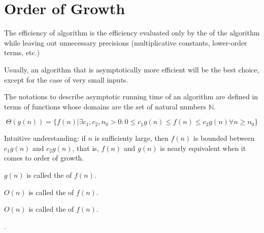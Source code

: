 \chapter{Order of Growth}

  \par The  efficiency of algorithm is the efficiency
  evaluated only by the  of the algorithm while leaving
  out unnecessary precisions (multiplicative constants, lower-order terms,
  etc.)
  \par Usually, an algorithm that is asymptotically more efficient will
  be the best choice, except for the case of very small inputs.

  \par The notations to describe asymptotic running time of an algorithm
  are defined in terms of functions whose domains are the set of natural
  numbers $\mathbb{N}$.
  
    \begin{equation}
      \Theta(g(n)) = \{f(n) | \exists c_{1}, c_{2}, n_{0} > 0:
      0 \leq c_{1}g(n) \leq f(n) \leq c_{2}g(n) \forall n \geq n_{0}\}
    \end{equation}
    \par Intuitive understanding: if $n$ is sufficienty large, then $f(n)$
    is bounded between $c_{1}g(n)$ and $c_{2}g(n)$, that is, $f(n)$
    and $g(n)$ is nearly equivalent when it comes to order of growth.
    \par $g(n)$ is called the  of $f(n)$.


    \par $O(n)$ is called the  of $f(n)$.

    \par $O(n)$ is called the  of $f(n)$.

    \par {}.

